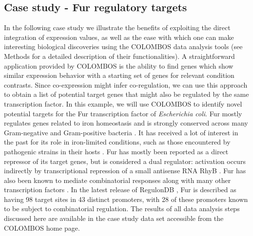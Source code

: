 \subsection{Case study - Fur regulatory targets}
In the following case study we illustrate the benefits of exploiting the direct 
integration of expression values, as well as the ease with which one can make 
interesting biological discoveries using the COLOMBOS data analysis tools (see 
Methods for a detailed description of their functionalities). A straightforward 
application provided by COLOMBOS is the ability to find genes which show 
similar expression behavior with a starting set of genes for relevant condition 
contrasts. Since co-expression might infer co-regulation, we can use this 
approach to obtain a list of potential target genes that might also be 
regulated by the same transcription factor. In this example, we will use 
COLOMBOS to identify novel potential targets for the Fur transcription factor 
of {\it Escherichia coli}. Fur mostly regulates genes related to iron 
homeostasis and is strongly conserved across many Gram-negative and 
Gram-positive bacteria \cite{Chen2007}. It has received a lot of interest in 
the past for its role in iron-limited conditions, such as those encountered by 
pathogenic strains in their hosts \cite{Panina2001}. Fur has mostly been 
reported as a direct repressor of its target genes, but is considered a dual 
regulator: activation occurs indirectly by transcriptional repression of a 
small antisense RNA RhyB \cite{Masse2002}. Fur has also been known to mediate 
combinatorial responses along with many other transcription factors 
\cite{Patzer2001, Zhang2005}. In the latest release of RegulonDB 
\cite{Gama-Castro2008}, Fur is described as having 98 target sites in 43 
distinct promoters, with 28 of these promoters known to be subject to 
combinatorial regulation. The results of all data analysis steps discussed here 
are available in the case study data set accessible from the COLOMBOS home page.

